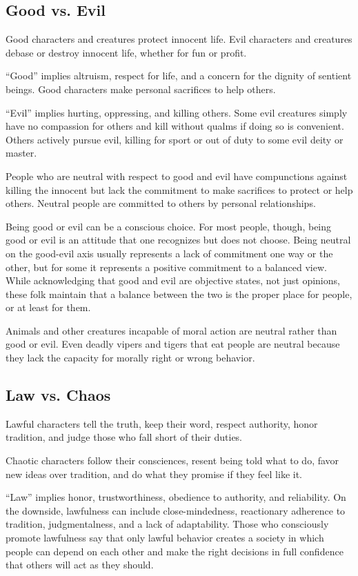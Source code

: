 \subsection{Good vs. Evil}
Good characters and creatures protect innocent life. Evil characters and creatures debase or destroy innocent life, whether for fun or profit.

``Good'' implies altruism, respect for life, and a concern for the dignity of sentient beings. Good characters make personal sacrifices to help others.

``Evil'' implies hurting, oppressing, and killing others. Some evil creatures simply have no compassion for others and kill without qualms if doing so is convenient. Others actively pursue evil, killing for sport or out of duty to some evil deity or master.

People who are neutral with respect to good and evil have compunctions against killing the innocent but lack the commitment to make sacrifices to protect or help others. Neutral people are committed to others by personal relationships.

Being good or evil can be a conscious choice. For most people, though, being good or evil is an attitude that one recognizes but does not choose. Being neutral on the good-evil axis usually represents a lack of commitment one way or the other, but for some it represents a positive commitment to a balanced view. While acknowledging that good and evil are objective states, not just opinions, these folk maintain that a balance between the two is the proper place for people, or at least for them.

Animals and other creatures incapable of moral action are neutral rather than good or evil. Even deadly vipers and tigers that eat people are neutral because they lack the capacity for morally right or wrong behavior.

\subsection{Law vs. Chaos}
Lawful characters tell the truth, keep their word, respect authority, honor tradition, and judge those who fall short of their duties.

Chaotic characters follow their consciences, resent being told what to do, favor new ideas over tradition, and do what they promise if they feel like it.

``Law'' implies honor, trustworthiness, obedience to authority, and reliability. On the downside, lawfulness can include close-mindedness, reactionary adherence to tradition, judgmentalness, and a lack of adaptability. Those who consciously promote lawfulness say that only lawful behavior creates a society in which people can depend on each other and make the right decisions in full confidence that others will act as they should.

